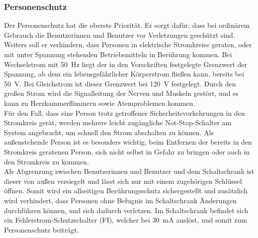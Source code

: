 \subsubsection{Personenschutz}\label{sc: Personenschutz}
Der Personenschutz hat die oberste Priorität. Er sorgt dafür, dass bei ordinärem Gebrauch die Benutzerinnen und Benutzer vor Verletzungen geschützt sind. Weiters soll er verhindern, dass Personen in elektrische Stromkreise geraten, oder mit unter Spannung stehenden Betriebsmitteln in Berührung kommen. Bei Wechselstrom mit \qty{50}{\hertz} liegt der in den Vorschriften festgelegte Grenzwert der Spannung, ab dem ein lebensgefährlicher Körperstrom fließen kann, bereits bei \qty{50}{\volt}. Bei Gleichstrom ist dieser Grenzwert bei \qty{120}{\volt} festgelegt.\cite{SeyrRösch} Durch den großen Strom wird die Signalleitung der Nerven und Muskeln gestört, und es kann zu Herzkammerflimmern sowie Atemproblemen kommen.\cite{Gefahr_el_Strom}\\
Für den Fall, dass eine Person trotz getroffener Sicherheitsvorkehrungen in den Stromkreis gerät, werden mehrere leicht zugängliche Not-Stop-Schalter am System angebracht, um schnell den Strom abschalten zu können. Als außenstehende Person ist es besonders wichtig, beim Entfernen der bereits in den Stromkreis geratenen Person, sich nicht selbst in Gefahr zu bringen oder auch in den Stromkreis zu kommen.\\
Als Abgrenzung zwischen Benutzerinnen und Benutzer und dem Schaltschrank ist dieser von außen versiegelt und lässt sich nur mit einem zugehörigen Schlüssel öffnen. Somit wird ein allseitigen Berührungsschutz sichergestellt und zusätzlich wird verhindert, dass Personen ohne Befugnis im Schaltschrank Änderungen durchführen können, und sich dadurch verletzen. Im Schaltschrank befindet sich ein Fehlerstrom-Schutzschalter (FI), welcher bei \qty{30}{\milli\ampere} auslöst, und somit zum Personenschutz beiträgt.

